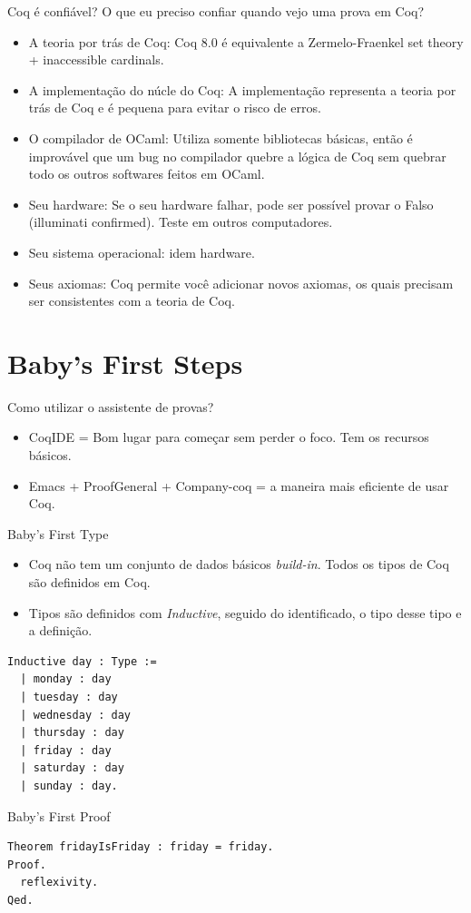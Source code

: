 \documentclass[presentation]{beamer}
\begin{document}
\begin{frame}[label={sec:orga63fa45}]{Coq é confiável?}
O que eu preciso confiar quando vejo uma prova em Coq? 
\begin{itemize}
\item \alert{A teoria por trás de Coq}: Coq 8.0 é equivalente a Zermelo-Fraenkel set theory + inaccessible cardinals.
\item \alert{A implementação do núcle do Coq}: A implementação representa a teoria por trás de Coq e é pequena para evitar o risco de erros.
\item \alert{O compilador de OCaml}: Utiliza somente bibliotecas básicas, então é improvável que um bug no compilador quebre a lógica de Coq sem quebrar todo os outros softwares feitos em OCaml.
\item \alert{Seu hardware}: Se o seu hardware falhar, pode ser possível provar o Falso (illuminati confirmed). Teste em outros computadores.
\item \alert{Seu sistema operacional}: idem hardware.
\item \alert{Seus axiomas}: Coq permite você adicionar novos axiomas, os quais precisam ser consistentes com a teoria de Coq.
\end{itemize}
\end{frame}

\section{Baby's First Steps}
\label{sec:org098f53c}

\begin{frame}[label={sec:org1c4f352}]{Como utilizar o assistente de provas?}
\begin{itemize}
\item CoqIDE = Bom lugar para começar sem perder o foco. Tem os recursos básicos.
\item Emacs + ProofGeneral + Company-coq = a maneira mais eficiente de usar Coq.
\end{itemize}
\end{frame}

\begin{frame}[fragile,label={sec:orgb1903e7}]{Baby's First Type}
 \begin{itemize}
\item Coq não tem um conjunto de dados básicos \emph{build-in}. Todos os tipos de Coq são definidos em Coq.
\item Tipos são definidos com \emph{Inductive}, seguido do identificado, o tipo desse tipo e a definição.
\end{itemize}
\begin{verbatim}
Inductive day : Type :=
  | monday : day
  | tuesday : day
  | wednesday : day
  | thursday : day
  | friday : day
  | saturday : day
  | sunday : day.
\end{verbatim}
\end{frame}

\begin{frame}[fragile,label={sec:org29153db}]{Baby's First Proof}
 \begin{verbatim}
Theorem fridayIsFriday : friday = friday.
Proof.
  reflexivity.
Qed.
\end{verbatim}
\end{frame}
\end{document}
